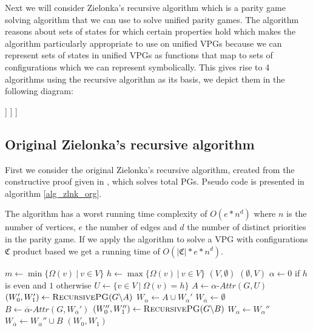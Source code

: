 Next we will consider Zielonka's recursive algorithm \cite{ZIELONKA1998135} which is a parity game solving algorithm that we can use to solve unified parity games. The algorithm reasons about sets of states for which certain properties hold which makes the algorithm particularly appropriate to use on unified VPGs because we can represent sets of states in unified VPGs as functions that map to sets of configurations which we can represent symbolically. This gives rise to 4 algorithms using the recursive algorithm as its basis, we depict them in the following diagram:
\begin{center}
	\begin{forest}
		[Recursive algorithm, for tree={parent anchor=south, child anchor=north, align=center, s sep=5mm}
		[Product based]
		[Family based
		[Set-wise]
		[Function-wise
		[Explicit]
		[Symbolic]
		]
		]
		]
	\end{forest}
\end{center}


\subsection{Original Zielonka's recursive algorithm}
First we consider the original Zielonka's recursive algorithm, created from the constructive proof given in \cite{ZIELONKA1998135}, which solves total PGs. Pseudo code is presented in algorithm \ref{alg_zlnk_org}.

The algorithm has a worst running time complexity of $O(e*n^d)$ where $n$ is the number of vertices, $e$ the number of edges and $d$ the number of distinct priorities in the parity game. If we apply the algorithm to solve a VPG with configurations $\mathfrak{C}$ product based we get a running time of $O(|\mathfrak{C}| *e*n^d)$.
\begin{algorithm}
	\caption{$\textsc{RecursivePG}(\textit{PG } G = (V,V_0,V_1, E, \Omega))$}
	\label{alg_zlnk_org}
	\begin{algorithmic}[1]
		\State $m \gets \min\{ \Omega(v)\ |\ v \in V\}$
		\State $h \gets\max\{ \Omega(v)\ |\ v \in V\}$
		\State \Return $(V,\emptyset)$
		\Else
		\State \Return $(\emptyset, V)$
		\EndIf
		\EndIf
		\State $\alpha \gets 0$ if $h$ is even and $1$ otherwise
		\State $U \gets \{v \in V\ |\ \Omega(v) = h\}$
		\State $A \gets \alpha\textit{-Attr}(G, U)$
		\State $(W_0', W_1') \gets \textsc{RecursivePG}(G \backslash A)$
		\State $W_\alpha \gets A \cup W_\alpha'$
		\State $W_{\overline{\alpha}} \gets \emptyset$
		\Else
		\State $B \gets \overline{\alpha}\textit{-Attr}(G,W_{\overline{\alpha}}')$
		\State $(W_0'', W_1'') \gets \textsc{RecursivePG}(G \backslash B)$
		\State $W_\alpha \gets W_\alpha''$
		\State $W_{\overline{\alpha}} \gets W_{\overline{\alpha}}'' \cup B$
		\EndIf
		\State \Return $(W_0, W_1)$
	\end{algorithmic}
\end{algorithm}

